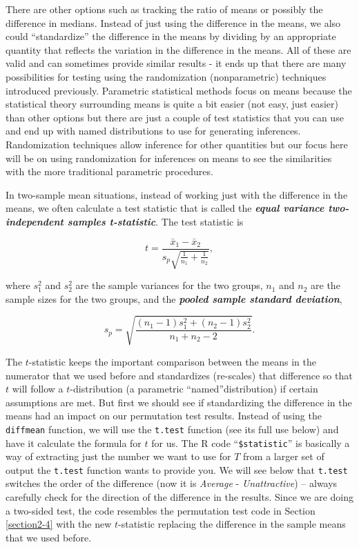 \documentclass[]{book}
\theoremstyle{definition}
\theoremstyle{definition}
\theoremstyle{remark}
\begin{document}
There are other options such as tracking the ratio of means or possibly
the difference in medians. Instead of just using the difference in the
means, we also could ``standardize'' the difference in the means by
dividing by an appropriate quantity that reflects the variation in the
difference in the means. All of these are valid and can sometimes
provide similar results - it ends up that there are many possibilities
for testing using the randomization (nonparametric) techniques
introduced previously. Parametric statistical methods focus on means
because the statistical theory surrounding means is quite a bit easier
(not easy, just easier) than other options but there are just a couple
of test statistics that you can use and end up with named distributions
to use for generating inferences. Randomization techniques allow
inference for other quantities but our focus here will be on using
randomization for inferences on means to see the similarities with the
more traditional parametric procedures.

In two-sample mean situations, instead of working just with the
difference in the means, we often calculate a test statistic that is
called the \textbf{\emph{equal variance two-independent samples
t-statistic}}. The test statistic is

\[t = \frac{\bar{x}_1 - \bar{x}_2}{s_p\sqrt{\frac{1}{n_1}+\frac{1}{n_2}}},\]

where \(s_1^2\) and \(s_2^2\) are the sample variances for the two
groups, \(n_1\) and \(n_2\) are the sample sizes for the two groups, and
the \textbf{\emph{pooled sample standard deviation}},

\[s_p = \sqrt{\frac{(n_1-1)s_1^2 + (n_2-1)s_2^2}{n_1+n_2-2}}.\]

The \(t\)-statistic keeps the important comparison between the means in
the numerator that we used before and standardizes (re-scales) that
difference so that \(t\) will follow a \(t\)-distribution (a parametric
``named''distribution) if certain assumptions are met. But first we
should see if standardizing the difference in the means had an impact on
our permutation test results. Instead of using the \texttt{diffmean}
function, we will use the \texttt{t.test} function (see its full use
below) and have it calculate the formula for \(t\) for us. The R code
``\texttt{\$statistic}'' is basically a way of extracting just the
number we want to use for \(T\) from a larger set of output the
\texttt{t.test} function wants to provide you. We will see below that
\texttt{t.test} switches the order of the difference (now it is
\emph{Average} - \emph{Unattractive}) -- always carefully check for the
direction of the difference in the results. Since we are doing a
two-sided test, the code resembles the permutation test code in Section
\ref{section2-4} with the new \(t\)-statistic replacing the difference
in the sample means that we used before.
\end{document}
